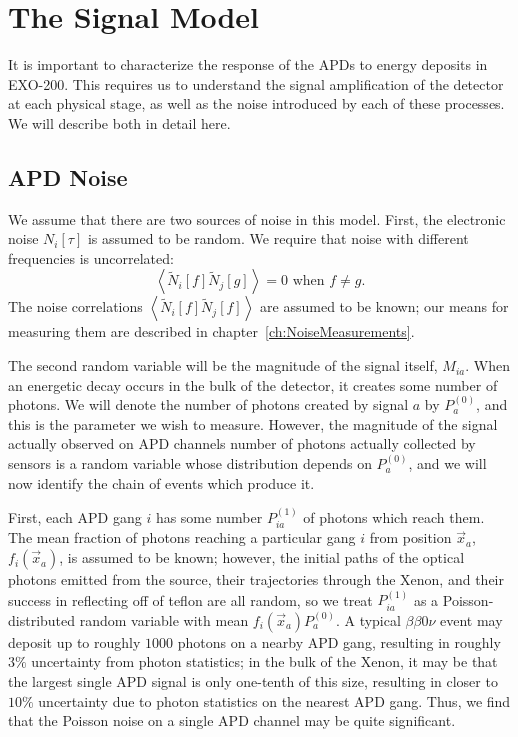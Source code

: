 \section{The Signal Model}

It is important to characterize the response of the APDs to energy deposits in EXO-200.  This requires us to understand the signal amplification of the detector at each physical stage, as well as the noise introduced by each of these processes.  We will describe both in detail here.

\subsection{APD Noise}\label{sec:DescriptionOfPhotonNoise}

We assume that there are two sources of noise in this model.  First, the electronic noise $N_i[\tau]$ is assumed to be random.  We require that noise with different frequencies is uncorrelated:
\begin{equation}\label{eq:FirstStatementOfNoiseCorrelations}
\left< \widetilde{N}_i[f] \widetilde{N}_j[g] \right> = 0 \text{~when~} f \ne g.
\end{equation}
The noise correlations $\left< \widetilde{N}_i[f] \widetilde{N}_j[f] \right>$ are assumed to be known; our means for measuring them are described in chapter~\ref{ch:NoiseMeasurements}.

The second random variable will be the magnitude of the signal itself, $M_{ia}$.  When an energetic decay occurs in the bulk of the detector, it creates some number of photons.  We will denote the number of photons created by signal $a$ by $P^{(0)}_a$, and this is the parameter we wish to measure.  However, the magnitude of the signal actually observed on APD channels number of photons actually collected by sensors is a random variable whose distribution depends on $P^{(0)}_a$, and we will now identify the chain of events which produce it.

First, each APD gang $i$ has some number $P^{(1)}_{ia}$ of photons which reach them.  The mean fraction of photons reaching a particular gang $i$ from position $\vec{x}_a$, $f_i(\vec{x}_a)$, is assumed to be known; however, the initial paths of the optical photons emitted from the source, their trajectories through the Xenon, and their success in reflecting off of teflon are all random, so we treat $P^{(1)}_{ia}$ as a Poisson-distributed random variable with mean $f_i(\vec{x}_a)P^{(0)}_a$.  A typical $\beta\beta 0\nu$ event may deposit up to roughly $1000$ photons on a nearby APD gang, resulting in roughly $3\%$ uncertainty from photon statistics; in the bulk of the Xenon, it may be that the largest single APD signal is only one-tenth of this size, resulting in closer to $10\%$ uncertainty due to photon statistics on the nearest APD gang.  Thus, we find that the Poisson noise on a single APD channel may be quite significant.


